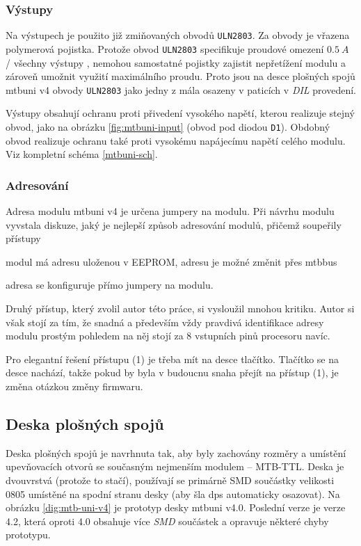 \subsubsection{Výstupy}

Na výstupech je použito již zmiňovaných obvodů \texttt{ULN2803}. Za obvody
je vřazena polymerová pojistka. Protože obvod \texttt{ULN2803} specifikuje
proudové omezení $0.5~A$ / všechny výstupy \cite{uln2803-datasheet}, nemohou
samostatné pojistky zajistit nepřetížení modulu a zároveň umožnit využití
maximálního proudu. Proto jsou na desce plošných spojů \gls{mtbuni} v4 obvody
\texttt{ULN2803} jako jedny z mála osazeny v paticích v \textit{DIL} provedení.

Výstupy obsahují ochranu proti přivedení vysokého napětí, kterou realizuje
stejný obvod, jako na obrázku \ref{fig:mtbuni-input} (obvod pod diodou
\texttt{D1}). Obdobný obvod realizuje ochranu také proti vysokému napájecímu
napětí celého modulu. Viz kompletní schéma \ref{mtbuni-sch}.

\subsubsection{Adresování}

Adresa modulu \gls{mtbuni} v4 je určena jumpery na modulu. Při návrhu modulu
vyvstala diskuze, jaký je nejlepší způsob adresování modulů, přičemž soupeřily
přístupy

\begin{compactenum}
\item modul má adresu uloženou v EEPROM, adresu je možné změnit přes \gls{mtbbus}
\item adresa se konfiguruje přímo jumpery na modulu.
\end{compactenum}

Druhý přístup, který zvolil autor této práce, si vysloužil mnohou kritiku.
Autor si však stojí za tím, že snadná a především vždy pravdivá identifikace
adresy modulu prostým pohledem na něj stojí za 8 vstupních pinů procesoru navíc.

Pro elegantní řešení přístupu (1) je třeba mít na desce tlačítko. Tlačítko se
na desce nachází, takže pokud by byla v budoucnu snaha přejít na přístup (1),
je změna otázkou změny firmwaru.

\subsection{Deska plošných spojů}

Deska plošných spojů je navrhnuta tak, aby byly zachovány rozměry a umístění
upevňovacích otvorů se současným nejmenším modulem – MTB-TTL. Deska je dvouvrstvá
(protože to stačí), používají se primárně SMD součástky velikosti 0805 umístěné
na spodní stranu desky (aby šla \gls{dps} automaticky osazovat). Na obrázku
\ref{dig:mtb-uni-v4} je prototyp desky \gls{mtbuni} v4.0. Poslední verze je
verze 4.2, která oproti 4.0 obsahuje více \textit{SMD} součástek a opravuje
některé chyby prototypu.

